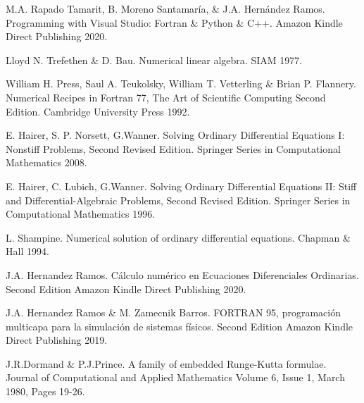 \begin{thebibliography}{99}

    
     M.A. Rapado Tamarit, B. Moreno Santamar\'ia, \& J.A. Hern\'andez Ramos. Programming with Visual Studio: Fortran \& Python \& C++. 
                          Amazon Kindle Direct Publishing 2020. 

     Lloyd N. Trefethen \&  D. Bau. Numerical linear algebra. SIAM 1977.
    
     William H. Press, Saul A. Teukolsky, William T. Vetterling \& Brian P. Flannery. Numerical Recipes
    in Fortran 77,
    The Art of Scientific Computing
    Second Edition. Cambridge University Press 1992.
    
     E. Hairer, S. P. Norsett, G.Wanner. Solving Ordinary
    Differential Equations I: Nonstiff Problems, Second Revised Edition. Springer Series in Computational Mathematics 2008.
    
     E. Hairer, C. Lubich, G.Wanner. Solving Ordinary
    Differential Equations II: Stiff and Differential-Algebraic Problems, Second Revised Edition. Springer Series in Computational Mathematics 1996.
    
    
    
     L. Shampine. Numerical solution of ordinary differential equations. Chapman \& Hall 1994.
    
     J.A. Hernandez Ramos. C\'alculo num\'erico en Ecuaciones Diferenciales Ordinarias.
                  Second Edition Amazon Kindle Direct Publishing 2020.
    
     J.A. Hernandez Ramos \& M. Zamecnik Barros. FORTRAN 95, programación multicapa para la simulación de sistemas físicos. Second Edition Amazon Kindle Direct Publishing 2019.
    
     J.R.Dormand \& P.J.Prince. A family of embedded Runge-Kutta formulae. Journal of Computational and Applied Mathematics
    Volume 6, Issue 1, March 1980, Pages 19-26.


\end{thebibliography}
